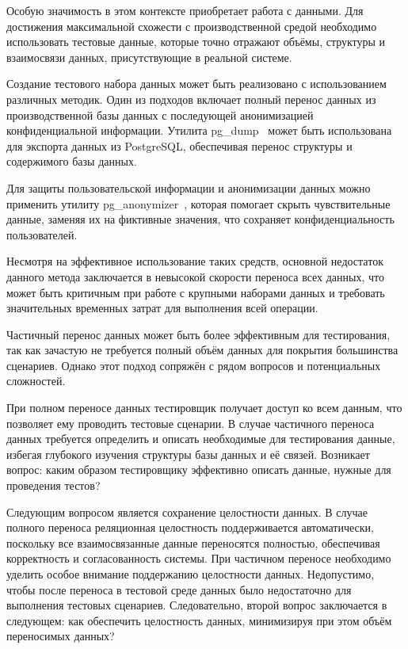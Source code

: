 Особую значимость в этом контексте приобретает работа с данными. Для достижения максимальной схожести с производственной средой необходимо использовать тестовые данные, которые точно отражают объёмы, структуры и взаимосвязи данных, присутствующие в реальной системе.

Создание тестового набора данных может быть реализовано с использованием различных методик. Один из подходов включает полный перенос данных из производственной базы данных с последующей анонимизацией конфиденциальной информации. Утилита pg\_dump~\cite{pg-dump} может быть использована для экспорта данных из PostgreSQL, обеспечивая перенос структуры и содержимого базы данных.

Для защиты пользовательской информации и анонимизации данных можно применить утилиту pg\_anonymizer~\cite{pg-anonymizer}, которая помогает скрыть чувствительные данные, заменяя их на фиктивные значения, что сохраняет конфиденциальность пользователей.

Несмотря на эффективное использование таких средств, основной недостаток данного метода заключается в невысокой скорости переноса всех данных, что может быть критичным при работе с крупными наборами данных и требовать значительных временных затрат для выполнения всей операции.

Частичный перенос данных может быть более эффективным для тестирования, так как зачастую не требуется полный объём данных для покрытия большинства сценариев. Однако этот подход сопряжён с рядом вопросов и потенциальных сложностей.

При полном переносе данных тестировщик получает доступ ко всем данным, что позволяет ему проводить тестовые сценарии. В случае частичного переноса данных требуется определить и описать необходимые для тестирования данные, избегая глубокого изучения структуры базы данных и её связей. Возникает вопрос: каким образом тестировщику эффективно описать данные, нужные для проведения тестов?

Следующим вопросом является сохранение целостности данных. В случае полного переноса реляционная целостность поддерживается автоматически, поскольку все взаимосвязанные данные переносятся полностью, обеспечивая корректность и согласованность системы. При частичном переносе необходимо уделить особое внимание поддержанию целостности данных. Недопустимо, чтобы после переноса в тестовой среде данных было недостаточно для выполнения тестовых сценариев. Следовательно, второй вопрос заключается в следующем: как обеспечить целостность данных, минимизируя при этом объём переносимых данных?

